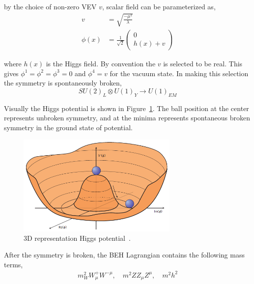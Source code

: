 by the choice of non-zero \gls{VEV} \( v \), scalar field can be parameterized as,
%
\begin{align}
  v        & = \sqrt{\frac{- \mu^2}{\lambda}}                 \\
  \phi (x) & = \frac{1}{\sqrt{2}} \left( \begin{matrix}
                                             0 \\
                                             h (x) + v
                                           \end{matrix} \right)
\end{align}

where \( h(x) \) is the Higgs field.
By convention the
\( v \) is selected to be real. This gives
\( \phi^{1} = \phi^{2} = \phi^{3} = 0 \) and \( \phi^{4} = v \)
for the vacuum state. In making this selection
the symmetry is spontaneously broken,
%
\begin{equation}
  {SU(2)}_L \otimes {U(1)}_Y \rightarrow {U(1)}_{EM}
\end{equation}

Visually the Higgs potential is shown in Figure~\ref{fig:higgs-potential}. The ball position
at the center represents unbroken symmetry, and at the minima represents spontaneous
broken symmetry in the ground state of potential.
%
\begin{figure}[!ht]
  \centering
  \includegraphics[width=0.7\textwidth]{figures/higgspotential.png}
  \caption[3D representation of Higgs potential]%
  {3D representation Higgs potential~\cite{image-higgs-potential}.}%
  \label{fig:higgs-potential}
\end{figure}

After the symmetry is broken, the \gls{BEH} Lagrangian contains the following mass terms,
%
\begin{align}
  m^{2}_{W} W^{+}_{\mu} W^{- \mu}, \quad
  m^{2}{Z} Z_{\mu}Z^{\mu}, \quad m^{2} h^{2}
\end{align}

